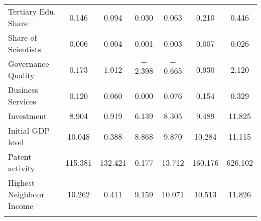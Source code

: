 \documentclass[11pt]{article}
\begin{document}
\begin{table}[!htbp]
\begin{tabular}{@{\extracolsep{5pt}}lcccccc}
Tertiary Edu. Share & 0.146 & 0.094 & 0.030 & 0.063 & 0.210 & 0.446 \\ 
Share of Scientists & 0.006 & 0.004 & 0.001 & 0.003 & 0.007 & 0.026 \\ 
Governance Quality & 0.173 & 1.012 & $-$2.398 & $-$0.665 & 0.930 & 2.120 \\  
Business Services & 0.120 & 0.060 & 0.000 & 0.076 & 0.154 & 0.329 \\ 
Investment & 8.904 & 0.919 & 6.139 & 8.305 & 9.489 & 11.825 \\  
Initial GDP level & 10.048 & 0.388 & 8.868 & 9.870 & 10.284 & 11.115 \\ 
Patent activity  & 115.381 & 132.421 & 0.177 & 13.712 & 160.176 & 626.102 \\ 
Highest Neighbour Income & 10.262 & 0.411 & 9.159 & 10.071 & 10.513 & 11.826 \\ 
\hline \\[-1.8ex] 
\end{tabular} 
\end{table} 
\end{document}

